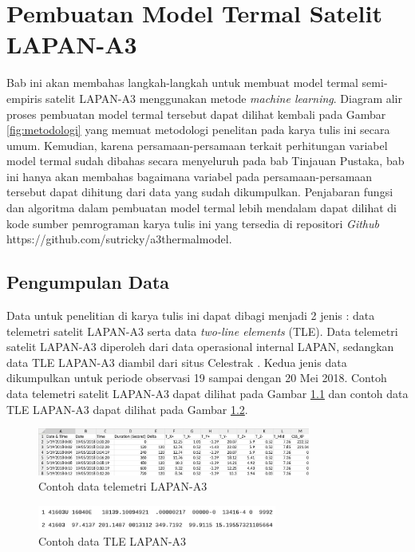 \chapter{Pembuatan Model Termal Satelit LAPAN-A3}

Bab ini akan membahas langkah-langkah untuk membuat model termal semi-empiris
satelit LAPAN-A3 menggunakan metode \textit{machine learning}. Diagram alir
proses pembuatan model termal tersebut dapat dilihat kembali pada Gambar
\ref{fig:metodologi} yang memuat metodologi penelitan pada karya tulis ini
secara umum. Kemudian, karena persamaan-persamaan terkait perhitungan variabel
model termal sudah dibahas secara menyeluruh pada bab Tinjauan Pustaka, bab ini
hanya akan membahas bagaimana variabel pada persamaan-persamaan tersebut dapat
dihitung dari data yang sudah dikumpulkan. Penjabaran fungsi dan algoritma
dalam pembuatan model termal lebih mendalam dapat dilihat di kode sumber
pemrograman karya tulis ini yang tersedia di repositori \textit{Github}
https://github.com/sutricky/a3thermalmodel.

\section{Pengumpulan Data}

Data untuk penelitian di karya tulis ini dapat dibagi menjadi 2 jenis : data
telemetri satelit LAPAN-A3 serta data \textit{two-line elements} (TLE). Data
telemetri satelit LAPAN-A3 diperoleh dari data operasional internal LAPAN,
sedangkan data TLE LAPAN-A3 diambil dari situs Celestrak \cite{kelso}. Kedua
jenis data dikumpulkan untuk periode observasi 19 sampai dengan 20 Mei 2018.
Contoh data telemetri satelit LAPAN-A3 dapat dilihat pada Gambar
\ref{fig:telea3} dan contoh data TLE LAPAN-A3 dapat dilihat pada Gambar
\ref{fig:tlea3}.

\begin{figure}[H]
\setlength{}
\begin{center}
\includegraphics[width=0.8\textwidth]{fig/telea3.png}
\caption{Contoh data telemetri LAPAN-A3}
\label{fig:telea3}
\end{center}
\end{figure}

\begin{figure}[H]
\setlength{}
\begin{center}
\includegraphics[width=0.7\textwidth]{fig/tlea3.png}
\caption{Contoh data TLE LAPAN-A3}
\label{fig:tlea3}
\end{center}
\end{figure}


